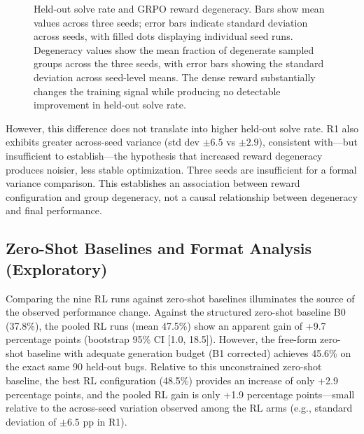 \documentclass{article}
\begin{document}
\begin{figure}[t]
\caption{Held-out solve rate and GRPO reward degeneracy. Bars show mean values across three seeds; error bars indicate standard deviation across seeds, with filled dots displaying individual seed runs. Degeneracy values show the mean fraction of degenerate sampled groups across the three seeds, with error bars showing the standard deviation across seed-level means. The dense reward substantially changes the training signal while producing no detectable improvement in held-out solve rate.}
\label{fig:main_results}
\end{figure}

However, this difference does not translate into higher held-out solve rate. R1 also exhibits greater across-seed variance (std dev $\pm 6.5$ vs $\pm 2.9$), consistent with---but insufficient to establish---the hypothesis that increased reward degeneracy produces noisier, less stable optimization. Three seeds are insufficient for a formal variance comparison. This establishes an association between reward configuration and group degeneracy, not a causal relationship between degeneracy and final performance.

\subsection{Zero-Shot Baselines and Format Analysis (Exploratory)}
Comparing the nine RL runs against zero-shot baselines illuminates the source of the observed performance change. Against the structured zero-shot baseline B0 (37.8\%), the pooled RL runs (mean 47.5\%) show an apparent gain of +9.7 percentage points (bootstrap 95\% CI [1.0, 18.5]). However, the free-form zero-shot baseline with adequate generation budget (B1 corrected) achieves 45.6\% on the exact same 90 held-out bugs. Relative to this unconstrained zero-shot baseline, the best RL configuration (48.5\%) provides an increase of only +2.9 percentage points, and the pooled RL gain is only +1.9 percentage points—small relative to the across-seed variation observed among the RL arms (e.g., standard deviation of $\pm 6.5$ pp in R1).
\end{document}
